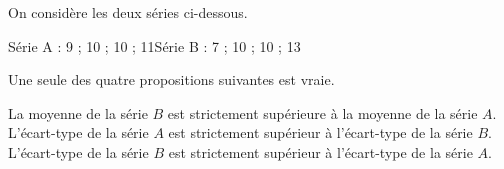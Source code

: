 
On considère les deux séries ci-dessous.

\smallskip

Série A : 9 ; 10 ; 10 ; 11\qquad\qquad Série B : 7 ; 10 ; 10 ; 13

\smallskip

Une seule des quatre propositions suivantes est vraie.

\smallskip

%
{La moyenne de la série $B$ est strictement supérieure à la moyenne de la série $A$.}%
{L'écart-type de la série $A$ est strictement supérieur à l'écart-type de la série $B$.}%
{L'écart-type de la série $B$ est strictement supérieur à l'écart-type de la série $A$.}

